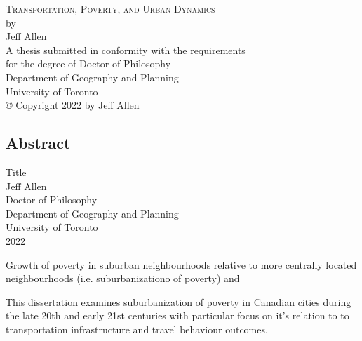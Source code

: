 \documentclass[11 pt, letterpaper]{report}
\begin{document}
	
{\begin{titlepage}
		\large
		\singlespacing
		\begin{center}
			\mbox{}
			\vfill
			\textsc{Transportation, Poverty, and Urban Dynamics}\\
			\vfill
			by \\
			\vfill
			{Jeff Allen}\\
			\vfill
			\vfill
			A thesis submitted in conformity with the requirements \\
			for the degree of Doctor of Philosophy  \\
			Department of Geography and Planning \\
			University of Toronto \\
			\vfill
			{\copyright} Copyright 2022 by Jeff Allen\\
			\vspace{.01\textheight}
			\mbox{}
		\end{center}
		\setcounter{page}{1}
	\end{titlepage}
	\setcounter{page}{2}}






\renewcommand{\thepage}{\roman{page}}%

\newpage



\begin{center}
\section*{Abstract}
	\singlespacing
	{Title}\\[2ex]
	{Jeff Allen}\\
	{Doctor of Philosophy}\\
	Department of Geography and Planning\\
	University of Toronto\\
	{2022}\\
\end{center}



Growth of poverty in suburban neighbourhoods relative to more centrally located neighbourhoods (i.e. suburbanizationo of poverty) and  

This dissertation examines suburbanization of poverty in Canadian cities during the late 20th and early 21st centuries with particular focus on it's relation to to transportation infrastructure and travel behaviour outcomes.
\end{document}
